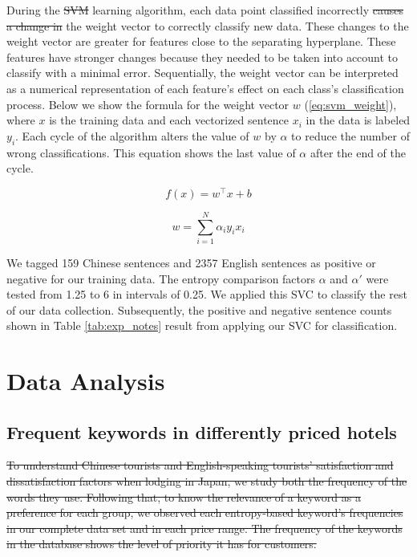 \documentclass[smallextended,natbib]{svjour3}       %
\providecommand{\DIFadd}[1]{{\protect\color{blue}\uwave{#1}}} %
\providecommand{\DIFdel}[1]{{\protect\color{red}\sout{#1}}}                      %
\providecommand{\DIFaddbegin}{} %
\providecommand{\DIFaddend}{} %
\providecommand{\DIFdelbegin}{} %
\providecommand{\DIFdelend}{} %
\newcommand{\DIFscaledelfig}{0.5}
\newlength{\DIFdelgraphicswidth} %
\newlength{\DIFdelgraphicsheight} %
\newcommand{\DIFaddincludegraphics}[2][]{{\color{blue}\fbox{\DIFOincludegraphics[#1]{#2}}}} %
\newcommand{\DIFdelincludegraphics}[2][]{%
\sbox{\DIFdelgraphicsbox}{\DIFOincludegraphics[#1]{#2}}%
\settoboxwidth{\DIFdelgraphicswidth}{\DIFdelgraphicsbox} %
\settoboxtotalheight{\DIFdelgraphicsheight}{\DIFdelgraphicsbox} %
\scalebox{\DIFscaledelfig}{%
\parbox[b]{\DIFdelgraphicswidth}{\usebox{\DIFdelgraphicsbox}\\[-\baselineskip] \rule{\DIFdelgraphicswidth}{0em}}\llap{\resizebox{\DIFdelgraphicswidth}{\DIFdelgraphicsheight}{%
\setlength{\unitlength}{\DIFdelgraphicswidth}%
\begin{picture}(1,1)%
\thicklines\linethickness{2pt} %
{\color[rgb]{1,0,0}\put(0,0){\framebox(1,1){}}}%
{\color[rgb]{1,0,0}\put(0,0){\line( 1,1){1}}}%
{\color[rgb]{1,0,0}\put(0,1){\line(1,-1){1}}}%
\end{picture}%
}\hspace*{3pt}}} %
} %
\DeclareRobustCommand{\DIFaddbegin}{\DIFOaddbegin \let\includegraphics\DIFaddincludegraphics} %
\DeclareRobustCommand{\DIFaddend}{\DIFOaddend \let\includegraphics\DIFOincludegraphics} %
\DeclareRobustCommand{\DIFdelbegin}{\DIFOdelbegin \let\includegraphics\DIFdelincludegraphics} %
\DeclareRobustCommand{\DIFdelend}{\DIFOaddend \let\includegraphics\DIFOincludegraphics} %
\begin{document}
    During the \DIFdelbegin \DIFdel{SVM }\DIFdelend \DIFaddbegin \DIFadd{SVC }\DIFaddend learning algorithm, each data point classified incorrectly \DIFdelbegin \DIFdel{causes a change in }\DIFdelend \DIFaddbegin \DIFadd{alters }\DIFaddend the weight vector to correctly classify new data. These changes to the weight vector are greater for features close to the separating hyperplane. These features have stronger changes because they needed to be taken into account to classify with a minimal error. Sequentially, the weight vector can be interpreted as a numerical representation of each feature's effect on each class's classification process. Below we show the formula for the weight vector \(w\) (\ref{eq:svm_weight}), where \(x\) is the training data and each vectorized sentence \(x_i\) in the data is labeled \(y_i\). Each cycle of the algorithm alters the value of \(w\) by \(\alpha\) to reduce the number of wrong classifications. This equation shows the last value of \(\alpha\) after the end of the cycle.

    \begin{equation}\label{eq:svm1}
    f(x) = w^\top x + b
    \end{equation}

    \begin{equation}\label{eq:svm_weight}
    w = \sum_{i=1}^N \alpha_i y_i x_i
    \end{equation}

    We tagged 159 Chinese sentences and \num[group-separator={,}]{2357} English sentences as positive or negative for our training data. The entropy comparison factors \(\alpha\) and \(\alpha'\) were tested from 1.25 to 6 in intervals of 0.25. We applied this SVC to classify the rest of our data collection. Subsequently, the positive and negative sentence counts shown in Table \ref{tab:exp_notes} result from applying our SVC for classification.

\section{Data Analysis}\label{dataanalysis}

  \subsection{Frequent keywords in differently priced hotels}\label{svmresults}

    \DIFdelbegin \DIFdel{To understand Chinese tourists and English-speaking tourists' satisfaction and dissatisfaction factors when lodging in Japan, we study both the frequency of the words they use. Following that, to know the relevance of a keyword as a preference for each group, we observed each entropy-based keyword's frequencies in our complete data set and in each price range. The frequency of the keywords in the database shows the level of priority it has for customers.
}%
\end{document}
